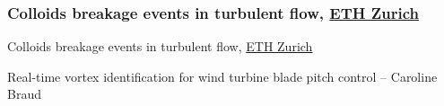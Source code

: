 \begin{frame}[label=app-24]
    \frametitle{Colloids breakage events in turbulent flow, \href{https://www.dropbox.com/s/aufwfraotj5rll7/colloids1.mp4?raw=1}{ETH Zurich}}
\end{frame}
    
    
\begin{frame}[label=app-25]{Colloids breakage events in turbulent flow, \href{https://www.dropbox.com/s/8cimpwfsukf11u2/colloids2.mp4?raw=1}{ETH Zurich}}
    \end{frame}
    
    
\begin{frame}[label=app-26]{Real-time vortex identification for wind turbine blade pitch control -- Caroline Braud}
    \begin{multicols*}{2}
    \end{multicols*}
\end{frame}
    
